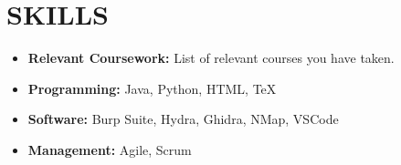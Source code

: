 \section*{SKILLS}
\begin{itemize}
    \item \textbf{Relevant Coursework:} List of relevant courses you have taken. %
    \item \textbf{Programming:} Java, Python, HTML, \TeX{}
    \item \textbf{Software:} Burp Suite, Hydra, Ghidra, NMap, VSCode
    \item \textbf{Management:} Agile, Scrum
\end{itemize}